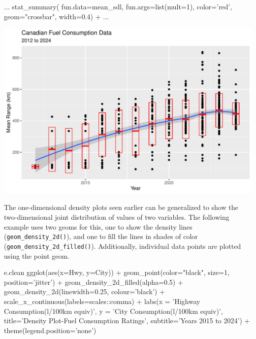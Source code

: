 \begin{samepage}
\begin{Rcode}
...
    stat_summary(
        fun.data=mean_sdl, 
        fun.args=list(mult=1), 
        color='red', 
        geom="crossbar",
        width=0.4) +
...
\end{Rcode}
\end{samepage}

\begin{center}
  \includegraphics[width=.8\textwidth]{fuel.linesSmoothCrossBar.pdf}
\end{center}

The one-dimensional density plots seen earlier can be generalized to show the two-dimensional joint distribution of values of two variables. The following example uses two geoms for this, one to show the density lines (\texttt{geom\_density\_2d()}), and one to fill the lines in shades of color (\texttt{geom\_density\_2d\_filled()}). Additionally, individual data points are plotted using the point geom. 

\begin{samepage}
\begin{Rcode}
e.clean %
  ggplot(aes(x=Hwy, y=City)) + 
    geom_point(color="black", size=1, 
               position='jitter') +
    geom_density_2d_filled(alpha=0.5) + 
    geom_density_2d(linewidth=0.25, colour='black') + 
    scale_x_continuous(labels=scales::comma) +
    labs(x = 'Highway Consumption\n(l/100km equiv)', 
         y = 'City Consumption\n(l/100km equiv)', 
         title='Density Plot-Fuel Consumption Ratings', 
         subtitle='Years 2015 to 2024') +
    theme(legend.position='none')
\end{Rcode}
\end{samepage}

